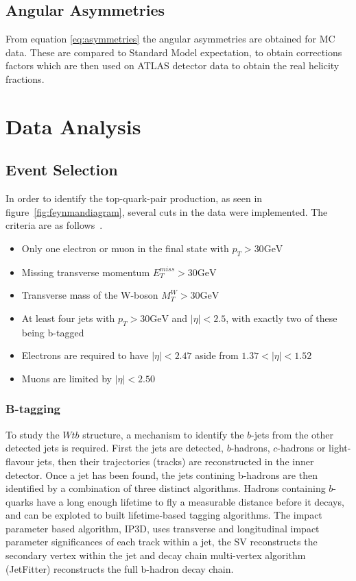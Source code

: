 \documentclass[12pt,a4paper]{article}
\numberwithin{equation}{section}
\begin{document}
\subsection{Angular Asymmetries}
From equation \eqref{eq:asymmetries} the angular asymmetries are obtained for MC data. These are compared to Standard Model expectation, to obtain corrections factors which are then used on ATLAS detector data to obtain the real helicity fractions.

\section{Data Analysis}


\subsection{Event Selection}\label{sec:cuts}
In order to identify the top-quark-pair production, as seen in
figure~\ref{fig:feynmandiagram}, several cuts in the data were implemented. The
criteria are as follows~\cite{oreach2020}.
\begin{itemize}
	\item Only one electron or muon in the final state with $p_{T} > 30 \mathrm{GeV}$
	\item Missing transverse momentum $E_{T}^{miss} > 30 \mathrm{GeV}$
	\item Transverse mass of the W-boson $M_{T}^{W} > 30 \mathrm{GeV}$
	\item At least four jets with $p_{T} > 30 \mathrm{GeV}$ and $|\eta| < 2.5$, with exactly two of these being b-tagged
	\item Electrons are required to have $|\eta| < 2.47$ aside from $1.37 < |\eta| < 1.52$
	\item Muons are limited by $|\eta| < 2.50$
\end{itemize}

\subsubsection{B-tagging}
To study the $Wtb$ structure, a mechanism to identify the $b$-jets from the
other detected jets is required. First the jets are detected, $b$-hadrons,
$c$-hadrons or light-flavour jets, then their trajectories (tracks) are
reconstructed in the inner detector. Once a jet has been found, the jets
contining b-hadrons are then identified by a combination of three distinct
algorithms. Hadrons containing $b$-quarks have a long enough lifetime to fly a
measurable distance before it decays, and can be exploted to built
lifetime-based tagging algorithms. The impact parameter based algorithm, IP3D,
uses transverse and longitudinal impact parameter significances of each track
within a jet, the SV reconstructs the secondary vertex within the jet and decay
chain multi-vertex algorithm (JetFitter) reconstructs the full b-hadron
decay chain.\\
\end{document}
